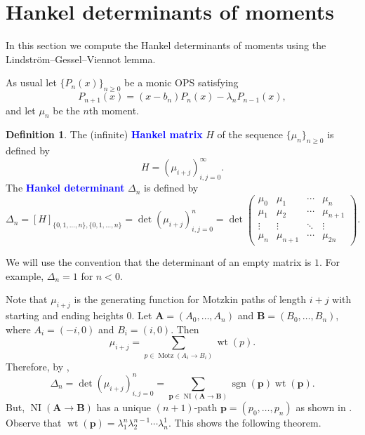 \documentclass[oneside]{book}
\numberwithin{equation}{section}
\theoremstyle{definition}
\newtheorem{defn}[thm]{Definition}
\newcommand\NI{\operatorname{NI}}
\newcommand\Motz{\operatorname{Motz}}
\newcommand\sgn{\operatorname{sgn}}
\newcommand\wt{\operatorname{wt}}
\renewcommand\vec[1]{\mathbf{#1}}
\renewcommand\emph[1]{\textcolor{blue}{\bf #1}}
\begin{document}
\section{Hankel determinants of moments}

In this section we compute the Hankel determinants of moments using
the Lindstr\"om--Gessel--Viennot lemma.

As usual let \( \{ P_n(x) \}_{n\ge 0} \) be a monic OPS
satisfying
\[
  P_{n+1}(x) = (x-b_n) P_n(x) - \lambda_n P_{n-1}(x),
\]
and let \( \mu_n \) be the \( n \)th moment.


\begin{defn}\label{def:7}
  The (infinite) \emph{Hankel matrix} \( H \) of the sequence
  \( \{ \mu_n\}_{n\ge 0} \) is defined by
  \[
    H = \left( \mu_{i+j} \right)_{i,j=0}^\infty.
  \]
  The \emph{Hankel determinant} \( \Delta_n \) is defined by
\[
  \Delta_n = [H]_{\{0,1,\dots,n\},\{0,1,\dots,n\}} = \det \left(
    \mu_{i+j} \right)_{i,j=0}^n = \det
 \begin{pmatrix}
   \mu_0 & \mu_1 & \cdots & \mu_n\\
   \mu_1 & \mu_2 & \cdots & \mu_{n+1}\\
   \vdots & \vdots & \ddots & \vdots\\
   \mu_n & \mu_{n+1} & \cdots & \mu_{2n}
 \end{pmatrix}.
\]
\end{defn}

We will use the convention that the determinant of an empty matrix is
\( 1 \). For example, \( \Delta_{n} = 1 \) for \( n<0 \).

Note that \( \mu_{i+j} \) is the generating function for Motzkin paths
of length \( i+j \) with starting and ending heights \( 0 \). Let
\( \vec A = (A_0,\dots,A_n) \) and \( \vec B = (B_0,\dots,B_n) \),
where \( A_i = (-i,0) \) and \( B_i = (i,0) \). Then
\[
  \mu_{i+j} = \sum_{p\in \Motz(A_i\to B_i)} \wt(p).
\]
Therefore, by ,
\[
  \Delta_n = \det \left( \mu_{i+j} \right)_{i,j=0}^n = \sum_{\vec p
    \in \NI(\vec A \to \vec B)} \sgn(\vec p) \wt(\vec p).
\]
But, \( \NI(\vec A \to \vec B) \) has a unique \( (n+1) \)-path
\( \vec p = (p_0,\dots,p_n) \) as shown in .
Observe that \( \wt(\vec p) = \lambda_1^n \lambda_2^{n-1} \cdots \lambda_n^1 \).
This shows the following theorem.
\end{document}
